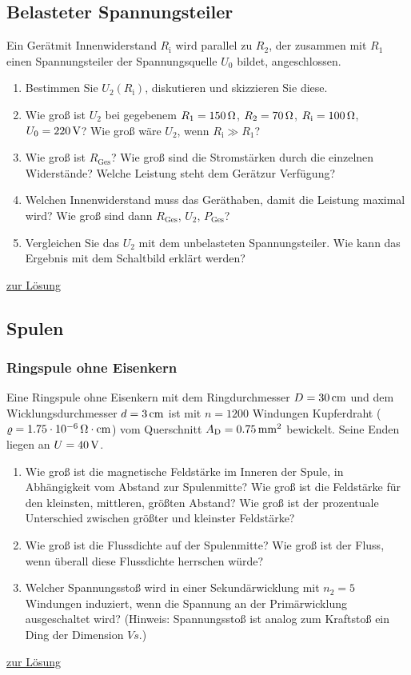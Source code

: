\documentclass[a4paper]{scrartcl}
\begin{document}
\subsection{Belasteter Spannungsteiler}
\label{aufg:Spannungsteiler}
Ein Gerät\texttrademark mit Innenwiderstand $R_\text{i}$ wird parallel zu $R_2$, der zusammen mit $R_1$ einen Spannungsteiler der Spannungsquelle $U_0$ bildet, angeschlossen.
\begin{enumerate}[noitemsep]
  \item Bestimmen Sie $U_2(R_\text{i})$, diskutieren und skizzieren Sie diese.
  \item Wie groß ist $U_2$ bei gegebenem $R_1 = \unit[150]{\Omega}$, $R_2 = \unit[70]{\Omega}$, $R_\text{i}=\unit[100]{\Omega}$, $U_0 = \unit[220]{V}$? Wie groß wäre $U_2$, wenn $R_\text{i} \gg R_1$?
  \item Wie groß ist $R_\text{Ges}$? Wie groß sind die Stromstärken durch die einzelnen Widerstände? Welche Leistung steht dem Gerät\texttrademark zur Verfügung?
  \item Welchen Innenwiderstand muss das Gerät\texttrademark haben, damit die Leistung maximal wird? Wie groß sind dann $R_\text{Ges}$, $U_2$, $P_\text{Ges}$?
  \item Vergleichen Sie das $U_2$ mit dem unbelasteten Spannungsteiler. Wie kann das Ergebnis mit dem Schaltbild erklärt werden?
\end{enumerate}

\hyperref[lsg:Spannungsteiler]{zur Lösung}

\subsection{Spulen}
\subsubsection{Ringspule ohne Eisenkern}
\label{aufg:RingspuleOhne}

Eine Ringspule ohne Eisenkern mit dem Ringdurchmesser $D = \unit[30]{cm}$ und dem Wicklungsdurchmesser $d = \unit[3]{cm}$ ist mit $n= 1200$ Windungen Kupferdraht ($\varrho = \unit[1.75 \cdot 10^{-6}]{\Omega \cdot cm}$) vom Querschnitt $A_\text{D} = \unit[0.75]{mm^2}$ bewickelt. Seine Enden liegen an $U = \unit[40]{V}$.
\begin{enumerate}[noitemsep]
  \item Wie groß ist die magnetische Feldstärke im Inneren der Spule, in Abhängigkeit vom Abstand zur Spulenmitte? Wie groß ist die Feldstärke für den kleinsten, mittleren, größten Abstand? Wie groß ist der prozentuale Unterschied zwischen größter und kleinster Feldstärke?
  \item Wie groß ist die Flussdichte auf der Spulenmitte? Wie groß ist der Fluss, wenn überall diese Flussdichte herrschen würde?
  \item Welcher Spannungsstoß wird in einer Sekundärwicklung mit $n_2=5$ Windungen induziert, wenn die Spannung an der Primärwicklung ausgeschaltet wird? (Hinweis: Spannungsstoß ist analog zum Kraftstoß ein Ding der Dimension $\unit{Vs}$.)
\end{enumerate}
\hyperref[lsg:RingspuleOhne]{zur Lösung}
\end{document}
